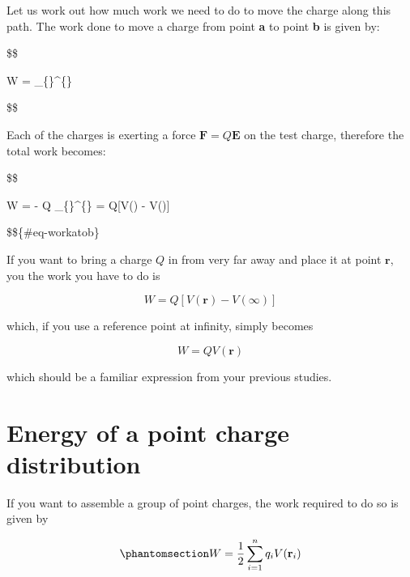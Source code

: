 \documentclass[
  letterpaper,
  DIV=11,
  numbers=noendperiod]{scrreprt}
\begin{document}
Let us work out how much work we need to do to move the charge along
this path. The work done to move a charge from point \textbf{a} to point
\textbf{b} is given by:

\$\$

W = \int\_\{\}\^{}\{\}
 \cdot {}  

\$\$

Each of the charges is exerting a force
\(\mathrm{\mathbf{F}}= Q \mathrm{\mathbf{E}}\) on the test charge,
therefore the total work becomes:

\$\$

W = - Q \int\_\{\}\^{}\{\}
 \cdot {}  =
Q{[}V() - V(){]}

\$\$\{\#eq-workatob\}

If you want to bring a charge \(Q\) in from very far away and place it
at point \(\mathrm{\mathbf{r}}\), you the work you have to do is

\[W = Q[V(\mathrm{\mathbf{r}}) - V(\infty)]\]

which, if you use a reference point at infinity, simply becomes

\[W = Q V(\mathrm{\mathbf{r}})\]

which should be a familiar expression from your previous studies.

\section{Energy of a point charge
distribution}\label{energy-of-a-point-charge-distribution}

If you want to assemble a group of point charges, the work required to
do so is given by

\begin{equation}\phantomsection\label{eq-workMulti}{ W = \frac{1}{2} \sum_{i=1}^n q_i V(\mathrm{\mathbf{r}}_i) }\end{equation}
\end{document}
